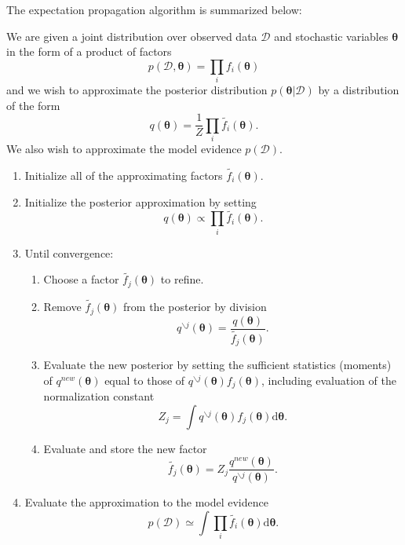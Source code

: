 \documentclass[a4paper]{report}
\newcommand{\ud}{\mathrm{d}}
\renewcommand{\cal}{\mathcal}
\newcommand{\bs}{\boldsymbol}
\begin{document}
The expectation propagation algorithm is summarized below:

We are given a joint distribution over observed data $\cal{D}$ and stochastic variables $\bs{\theta}$ in the form of a product of factors
\begin{equation}
	p(\cal{D},\bs{\theta}) = \prod_i f_i(\bs{\theta})
\end{equation}
and we wish to approximate the posterior distribution $p(\bs{\theta}|\cal{D})$ by a distribution of the form
\begin{equation}
	q(\bs{\theta}) = \frac{1}{Z} \prod_i \tilde{f_i}(\bs{\theta}).
\end{equation}
We also wish to approximate the model evidence $p(\cal{D})$.
\begin{enumerate}
	\item Initialize all of the approximating factors $\tilde{f_i}(\bs{\theta})$.
	\item Initialize the posterior approximation by setting
	\begin{equation}
		q(\bs{\theta}) \propto \prod_i \tilde{f_i}(\bs{\theta}).
	\end{equation}
	\item Until convergence:
		\begin{enumerate}
		\item Choose a factor $\tilde{f_j}(\bs{\theta})$ to refine.
		\item Remove $\tilde{f_j}(\bs{\theta})$ from the posterior by division
		\begin{equation}
			q^{\backslash j}(\bs{\theta}) = \frac{q(\bs{\theta})}{\tilde{f_j}(\bs{\theta})}.
		\end{equation}
		\item Evaluate the new posterior by setting the sufficient statistics (moments) of $q^{new}(\bs{\theta})$ equal to those of $q^{\backslash j}(\bs{\theta})f_j(\bs{\theta})$, including evaluation of the normalization constant
		\begin{equation}
			Z_j = \int q^{\backslash j}(\bs{\theta})f_j(\bs{\theta}) \ud \bs{\theta}.
		\end{equation}
		\item Evaluate and store the new factor
		\begin{equation}
			\tilde{f_j}(\bs{\theta}) = Z_j \frac{q^{new}(\bs{\theta})}{q^{\backslash j}(\bs{\theta})}.
		\end{equation}
		\end{enumerate}
		\item Evaluate the approximation to the model evidence
		\begin{equation}
			p(\cal{D}) \simeq \int \prod_i \tilde{f_i}(\bs{\theta})\ud \bs{\theta}.
		\end{equation}
\end{enumerate}
\end{document}
